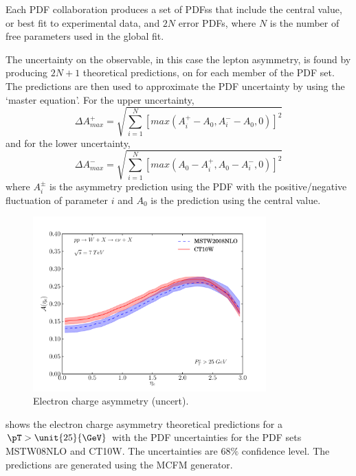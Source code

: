 Each \ac{PDF} collaboration produces a set of \acp{PDFs} that include the
central value, or best fit to experimental data, and $2N$ error \acp{PDF}, where
$N$ is the number of free parameters used in the global fit.\cite{bourilkov}

The uncertainty on the observable, in this case the lepton asymmetry, is found
by producing $2N+1$ theoretical predictions, on for each member of the \ac{PDF}
set. The predictions are then used to approximate the \ac{PDF} uncertainty by
using the `master equation'.\cite{bourilkov} For the upper uncertainty,
\begin{equation}
\Delta A^{+}_{max}
= \sqrt{ \sum^{N}_{i=1} \left[ max( A^{+}_i-A_{0}, A^{-}_i-A_{0}, 0 ) \right]^{2}}
\end{equation}
and for the lower uncertainty,
\begin{equation}
\Delta A^{-}_{max}
= \sqrt{ \sum^{N}_{i=1} \left[ max( A_{0}-A^{+}_i, A_{0}-A^{-}_i, 0 ) \right]^{2}}
\end{equation}
where $A^{\pm}_{i}$ is the asymmetry prediction using the \ac{PDF} with the
positive/negative fluctuation of parameter $i$ and $A_{0}$ is the prediction
using the central value.

\begin{figure}[htbp]
  \centering
  \includegraphics[width=0.8\textwidth]{asym-uncert}
  \caption{Electron charge asymmetry (uncert).}
  \label{fig:asym-uncert}
\end{figure}

 shows the electron charge asymmetry theoretical
predictions for a $\pT>\unit{25}{\GeV}$ with the \ac{PDF} uncertainties for the
\ac{PDF} sets MSTW08NLO\cite{MSTW} and CT10W\cite{CTEQ}. The uncertainties are
$68\%$ confidence level. The predictions are generated using the \ac{MCFM}
\cite{mcfm} generator.


